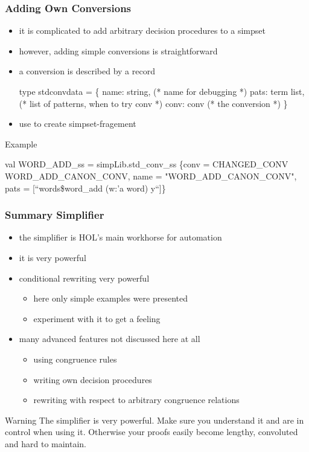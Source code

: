 \begin{frame}[fragile]
\frametitle{Adding Own Conversions}

\begin{itemize}
\item it is complicated to add arbitrary decision procedures to a simpset
\item however, adding simple conversions is straightforward
\item a conversion is described by a  record
\begin{semiverbatim}\scriptsize
type stdconvdata = \{ 
  name: string,    (* name for debugging *)
  pats: term list, (* list of patterns, when to try conv *)
  conv: conv       (* the conversion *)
\}
\end{semiverbatim}
\item use  to create simpset-fragement
\end{itemize}

\begin{exampleblock}{Example}
\begin{semiverbatim}\scriptsize
val WORD_ADD_ss =
  simpLib.std_conv_ss
    \{conv = CHANGED_CONV WORD_ADD_CANON_CONV,
     name = "WORD_ADD_CANON_CONV",
     pats = [``words\$word_add (w:'a word) y``]\}
\end{semiverbatim}
\end{exampleblock}
\end{frame}


\begin{frame}
\frametitle{Summary Simplifier}

\begin{itemize}
\item the simplifier is HOL's main workhorse for automation
\item it is very powerful
\item conditional rewriting very powerful
\begin{itemize}
\item here only simple examples were presented
\item experiment with it to get a feeling
\end{itemize}
\item many advanced features not discussed here at all
\begin{itemize}
\item using congruence rules
\item writing own decision procedures
\item rewriting with respect to arbitrary congruence relations
\end{itemize}
\end{itemize}


\begin{alertblock}{Warning}
The simplifier is very powerful. Make sure you understand it and are in control when using it.
Otherwise your proofs easily become lengthy, convoluted and hard to maintain.
\end{alertblock}


\end{frame}

